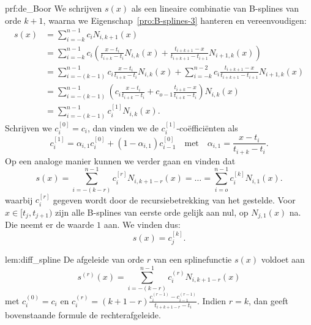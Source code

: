 \begin{prf}[de Boor]{prf:de_Boor}
    We schrijven $s(x)$ als een lineaire combinatie van B-splines van orde $k+1$, waarna we Eigenschap~\ref{pro:B-splines-3} hanteren en vereenvoudigen:
    \begin{align*}
        s(x) 
            &= \sum_{i=-k}^{n-1}c_i N_{i,k+1}(x) \\
            &= \sum_{i=-k}^{n-1}c_i
                \left(
                    \frac{x-t_i}{t_{i+k}-t_i} N_{i,k}(x) 
                    + \frac{t_{i+k+1} - x}{t_{i+k+1} - t_{i+1}} N_{i+1,k}(x)
                \right) \\
            &= \sum_{i=-(k-1)}^{n-1} c_i \frac{x-t_i}{t_{i+k} - t_i} N_{i,k}(x) 
                + \sum_{i=-k}^{n-2} c_i \frac{t_{i+k+1} - x}{t_{i+k+1} - t_{i+1}} N_{i+1,k}(x) \\
            &= \sum_{i=-(k-1)}^{n-1} 
                \left(
                    c_i \frac{x-t_i}{t_{i+k} - t_i} + c_{o-1} \frac{t_{i+k} - x}{t_{i+k} - t_i}
                \right)
                N_{i,k}(x) \\
            &= \sum_{i=-(k-1)}^{n-1} c_i^{[1]} N_{i,k}(x).
    \end{align*}
    Schrijven we $c_i^{[0]} = c_i$, dan vinden we de $c_i^{[1]}$-coëfficiënten als
    \begin{equation*}
        c_i^{[1]} = \alpha_{i,1} c_i^{[0]} + (1-\alpha_{i,1})c_{i-1}^{[0]} \quad \text{met} \quad \alpha_{i,1} = \frac{x-t_i}{t_{i+k}-t_i}. 
    \end{equation*} 
    Op een analoge manier kunnen we verder gaan en vinden dat 
    \begin{equation*}
        s(x) = \sum_{i=-(k-r)}^{n-1} c_i^{[r]}N_{i,k+1 - r}(x) = \ldots = \sum_{i=o}^{n-1} c_i^{[k]}N_{i,1}(x).
    \end{equation*}
    waarbij $c_i^{[r]}$ gegeven wordt door de recursiebetrekking van het gestelde. Voor $x\in[t_j,t_{j+1})$ zijn alle B-splines van eerste orde gelijk aan nul, op $N_{j,1}(x)$ na. Die neemt er de waarde $1$ aan. We vinden dus:
    \begin{equation*}
        s(x) = c_j^{[k]}.
    \end{equation*}
    \vspace{-0.8cm}
\end{prf}

\begin{lem}{lem:diff_spline}
    De afgeleide van orde $r$ van een splinefunctie $s(x)$ voldoet aan
    \begin{equation*}
        s^{(r)}(x) = \sum_{i=-(k-r)}^{n-1}c_i^{(r)}N_{i,k+1-r}(x)
    \end{equation*}
    met $c_i^{(0)} = c_i$ en $c_i^{(r)} = (k+1-r)\frac{c_i^{(r-1)} - c_{i-1}^{(r-1)}}{t_{i+k+1-r}-t_i}$. Indien $r=k$, dan geeft bovenstaande formule de rechterafgeleide.
\end{lem}

